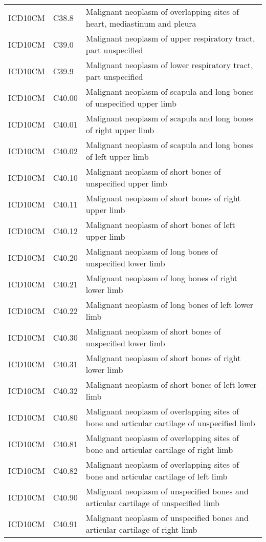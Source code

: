 \begin{longtable}{p{}p{}p{}}
  ICD10CM & C38.8 & Malignant neoplasm of overlapping sites of heart, mediastinum and pleura \\ 
  ICD10CM & C39.0 & Malignant neoplasm of upper respiratory tract, part unspecified \\ 
  ICD10CM & C39.9 & Malignant neoplasm of lower respiratory tract, part unspecified \\ 
  ICD10CM & C40.00 & Malignant neoplasm of scapula and long bones of unspecified upper limb \\ 
  ICD10CM & C40.01 & Malignant neoplasm of scapula and long bones of right upper limb \\ 
  ICD10CM & C40.02 & Malignant neoplasm of scapula and long bones of left upper limb \\ 
  ICD10CM & C40.10 & Malignant neoplasm of short bones of unspecified upper limb \\ 
  ICD10CM & C40.11 & Malignant neoplasm of short bones of right upper limb \\ 
  ICD10CM & C40.12 & Malignant neoplasm of short bones of left upper limb \\ 
  ICD10CM & C40.20 & Malignant neoplasm of long bones of unspecified lower limb \\ 
  ICD10CM & C40.21 & Malignant neoplasm of long bones of right lower limb \\ 
  ICD10CM & C40.22 & Malignant neoplasm of long bones of left lower limb \\ 
  ICD10CM & C40.30 & Malignant neoplasm of short bones of unspecified lower limb \\ 
  ICD10CM & C40.31 & Malignant neoplasm of short bones of right lower limb \\ 
  ICD10CM & C40.32 & Malignant neoplasm of short bones of left lower limb \\ 
  ICD10CM & C40.80 & Malignant neoplasm of overlapping sites of bone and articular cartilage of unspecified limb \\ 
  ICD10CM & C40.81 & Malignant neoplasm of overlapping sites of bone and articular cartilage of right limb \\ 
  ICD10CM & C40.82 & Malignant neoplasm of overlapping sites of bone and articular cartilage of left limb \\ 
  ICD10CM & C40.90 & Malignant neoplasm of unspecified bones and articular cartilage of unspecified limb \\ 
  ICD10CM & C40.91 & Malignant neoplasm of unspecified bones and articular cartilage of right limb \\ 

\end{longtable}
